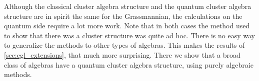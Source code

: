 Although the classical cluster algebra structure and the quantum cluster algebra
structure are in spirit the same for the Grassmannian, the calculations on the quantum
side require a lot more work. Note that in both cases the method used to show that
there was a cluster structure was quite ad hoc. There is no easy way to generalize the
methods to other types of algebras. This makes the results of
\cref{sec:cgl_extensions}, that much more surprising. There we show that a broad class
of algebras have a quantum cluster algebra structure, using purely algebraic methods.
